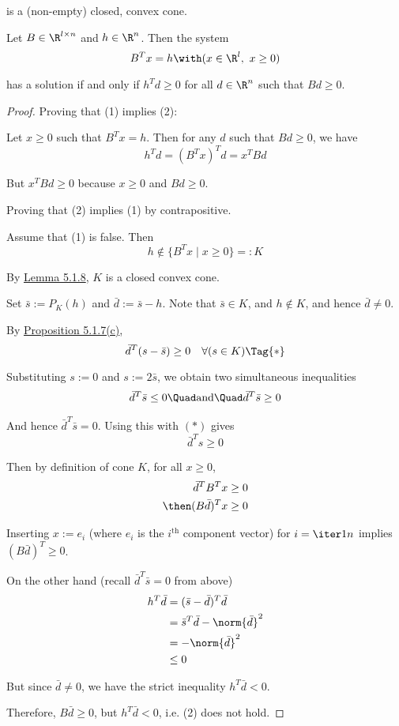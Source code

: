 is a (non-empty) closed, convex cone.

\label{d64b0db}

Let $B\in\R^{l\times n}$ and $h\in\R^n$. Then the system
$$
	B^Tx=h\with(x\in\R^l,\ x\geq0)
$$

has a solution if and only if $h^Td\geq0$ for all $d\in\R^n$ such that
$Bd\geq0$.

\begin{proof}
	Proving that (1) implies (2):

	Let $x\geq0$ such that $B^Tx=h$. Then for any $d$ such that
	$Bd\geq0$, we have
	$$
		h^Td=(B^Tx)^Td=x^TBd
	$$

	But $x^TBd\geq0$ because $x\geq0$ and $Bd\geq0$.

	Proving that (2) implies (1) by contrapositive.

	Assume that (1) is false. Then
	$$
		h\notin\{B^Tx \mid x\geq0\}=:K
	$$

	By \href{d2dff14}{Lemma 5.1.8}, $K$ is a closed convex cone.

	Set $\bar s:=P_K(h)$ and $\bar d:=\bar s-h$. Note that $\bar
		s\in K$, and $h\notin K$, and hence $\bar d\neq0$.

	By \href{ce30ae7}{Proposition 5.1.7(c)},
	\begin{equation*}
		\bar d^T(s-\bar s)\geq0\quad\forall(s\in K)\Tag{*}
	\end{equation*}

	Substituting $s:=0$ and $s:=2\bar s$, we obtain two simultaneous
	inequalities
	\begin{align*}
		\bar d^T\bar s\leq0\Quad\text{and}\Quad\bar d^T\bar s\geq0
	\end{align*}

	And hence $\bar d^T\bar s=0$. Using this with $(*)$ gives
	$$
		\bar d^Ts\geq0
	$$

	Then by definition of cone $K$, for all $x\geq0$,
	\begin{align*}
		\bar d^T B^Tx     & \geq0 \\
		\then(B\bar d)^Tx & \geq0
	\end{align*}

	Inserting $x:=e_i$ (where $e_i$ is the $i^\text{th}$ component
	vector) for $i=\iter1n$ implies $(B\bar d)^T\geq0$.

	On the other hand (recall $\bar d^T\bar s=0$ from above)
	\begin{align*}
		h^T\bar d & =(\bar s-\bar d)^T\bar d        \\
		          & =\bar s^T\bar d-\norm{\bar d}^2 \\
		          & =-\norm{\bar d}^2               \\
		          & \leq 0
	\end{align*}

	But since $\bar d\neq0$, we have the strict inequality $h^T\bar
		d<0$.

	Therefore, $B\bar d\geq0$, but $h^T\bar d<0$, i.e. (2) does not
	hold.
\end{proof}

